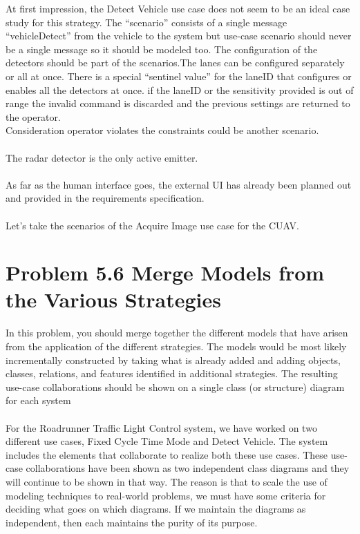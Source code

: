 \documentclass[12pt,a4paper]{article}
\begin{document}
At first impression, the Detect Vehicle use case does not seem to be an ideal case study for this strategy. The “scenario” consists of a single message “vehicleDetect” from the vehicle to the system but use-case scenario should never be a single message so it should be modeled too. The configuration of the detectors should be part of the scenarios.The lanes can be configured separately or all at once. There is a special “sentinel value” for the laneID that configures or enables all the detectors at once. if the laneID or the sensitivity provided is out of range the invalid
command is discarded and the previous settings are returned to the operator.\\
Consideration operator violates the constraints could be another scenario. 
\\\\
The radar detector is the only active emitter.
\\\\
As far as the human interface goes, the external UI has already been planned out and provided in the requirements specification.
\\\\
Let's take the scenarios of the Acquire Image
use case for the CUAV. \\


\section{Problem 5.6 Merge Models from the Various Strategies}
In this problem, you should merge together the different models that
have arisen from the application of the different strategies. The models would be most likely incrementally constructed by taking what is already added and adding objects, classes, relations, and features identified in additional strategies. The resulting use-case collaborations should be shown on a single
class (or structure) diagram for each system \\ \\

For the Roadrunner Traffic Light Control system, we have worked on two different use cases, Fixed Cycle Time Mode and Detect Vehicle. The system includes the elements that collaborate to realize both these use cases.  These use-case collaborations have been shown as two independent class diagrams and they will
continue to be shown in that way. The reason is that to scale the use of modeling techniques to real-world problems,
we must have some criteria for deciding what goes on which diagrams. If we maintain the diagrams as independent, then each maintains the purity of its purpose. \\ \\
\end{document}
